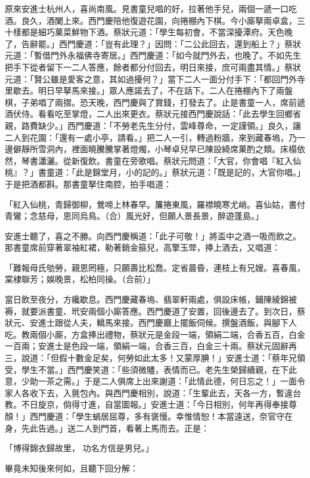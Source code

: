 \begin{showcontents}{}
原來安進士杭州人，喜尚南風。見書童兒唱的好，拉著他手兒，兩個一遞一口吃酒。良久，酒闌上來。西門慶陪他復遊花園，向捲棚內下棋。今小廝拏兩卓盒，三十樣都是細巧菓菜鮮物下酒。蔡狀元道：「學生每初會，不當深擾潭府。天色晚了，告辭罷。」西門慶道：「豈有此理？」因問：「二公此回去，還到船上？」蔡狀元道：「暫借門外永福佛寺寄居。」西門慶道：「如今就門外去，也晚了。不如先生把手下從者留下一二人答應，餘者都分付回去，明日來接，庶可兩盡其情。」蔡狀元道：「賢公雖是愛客之意，其如過擾何？」當下二人一面分付手下：「都回門外寺里歇去。明日早拏馬來接。」眾人應諾去了，不在話下。二人在捲棚內下了兩盤棋，子弟唱了兩摺。恐天晚，西門慶與了賞錢，打發去了。止是書童一人，席前遞酒伏侍。看看吃至掌燈，二人出來更衣。蔡狀元接西門慶說話：「此去學生回鄉省親，路費缺少。」西門慶道：「不勞老先生分付，雲峰尊命，一定謹領。」良久，讓二人到花園：「還有一處小亭，請看。」把二人一引，轉過粉牆，來到藏春塢，乃一邊僻靜所雪洞內，裡面曉騰騰掌著燈燭，小琴卓兒早已陳設綺席菓酌之類。床榻依然，琴書瀟灑。從新復飲。書童在旁歌唱。蔡狀元問道：「大官，你會唱『紅入仙桃』？」書童道：「此是錦堂月，小的記的。」蔡狀元道：「既是記的，大官你唱。」于是把酒都斟。那書童拏住南腔，拍手唱道：

「紅入仙桃，青歸御柳，鶯啼上林春早。簾捲東風，羅襟曉寒尤峭。喜仙姑，書付青鸞；念慈母，恩同烏鳥。（合）風光好，但願人景長景，醉遊蓬島。」

安進士聽了，喜之不勝。向西門慶稱道：「此子可敬！」將盃中之酒一吸而飲之。那書童席前穿著翠袖紅裙，勒著銷金箍兒，高擎玉斝，捧上酒去，又唱道：

「難報母氏劬勞，親恩罔極，只願壽比松喬。定省晨昏，連枝上有兄嫂。喜春風，棠棣聯芳；娛晚景，松柏同操。（合前）」

當日飲至夜分，方纔歇息。西門慶藏春塢、翡翠軒兩處，俱設床帳，鋪陳綾錦被褥，就要派書童、玳安兩個小廝答應。西門慶道了安置，回後邊去了。到次日，蔡狀元、安進士跟從人夫，轎馬來接。西門慶廳上擺飯伺候。撰盤酒飯，與腳下人吃。教兩個小廝，方盒捧出禮物，蔡狀元是金段一端，領絹二端，合香五百，白金一百兩；安進士是色段一端，領絹一端，合香三百，白金三十兩。蔡狀元固辭再三，說道：「但假十數金足矣，何勞如此太多！又蒙厚腆！」安進士道：「蔡年兄領受，學生不當。」西門慶笑道：「些須微贐，表情而已。老先生榮歸續親，在下此意，少助一茶之需。」于是二人俱席上出來謝道：「此情此德，何日忘之！」一面令家人各收下去，入氈包內。與西門慶相別，說道：「生輩此去，天各一方，暫違台教。不日旋京，倘得寸進，自當圖報。」安進士道：「今日相別，何年再得奉接尊顏！」西門慶道：「學生蝸居屈尊，多有褒慢。幸惟情恕！本當遠送，奈官守在身，先此告過。」送二人到門首，看著上馬而去。正是：

「博得錦衣歸故里，  功名方信是男兒。」

畢竟未知後來何如，且聽下回分解：





\end{showcontents}


